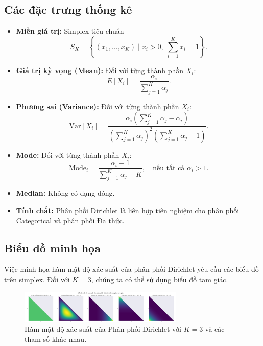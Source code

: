 	\subsection{Các đặc trưng thống kê}
	\begin{itemize}
		\item \textbf{Miền giá trị:} Simplex tiêu chuẩn 
		\[
		S_K = \left\{ (x_1, \dots, x_K) \mid x_i > 0,\; \sum_{i=1}^K x_i = 1 \right\}.
		\]

		\item \textbf{Giá trị kỳ vọng (Mean):} Đối với từng thành phần $X_i$:
		\[
		E[X_i] = \frac{\alpha_i}{\sum_{j=1}^K \alpha_j}.
		\]

		\item \textbf{Phương sai (Variance):} Đối với từng thành phần $X_i$:
		\[
		\mathrm{Var}[X_i] = 
		\frac{\alpha_i \left( \sum_{j=1}^K \alpha_j - \alpha_i \right)}
			{\left( \sum_{j=1}^K \alpha_j \right)^2 \left( \sum_{j=1}^K \alpha_j + 1 \right)}.
		\]

		\item \textbf{Mode:} Đối với từng thành phần $X_i$:
		\[
		\mathrm{Mode}_i = \frac{\alpha_i - 1}{\sum_{j=1}^K \alpha_j - K},
		\quad \text{nếu tất cả } \alpha_i > 1.
		\]

		\item \textbf{Median:} Không có dạng đóng.

		\item \textbf{Tính chất:} Phân phối Dirichlet là liên hợp tiên nghiệm cho phân phối Categorical và phân phối Đa thức.
	\end{itemize}

	
	\subsection{Biểu đồ minh họa}
	Việc minh họa hàm	 mật độ xác suất của phân phối Dirichlet yêu cầu các biểu đồ trên simplex. Đối với $K=3$, chúng ta có thể sử dụng biểu đồ tam giác.
	
	\begin{figure}[h!]
		\centering
		\includegraphics[width=0.7\textwidth]{images/Dirichlet Distribution-PDF.png} %
		\caption{Hàm mật độ xác suất của Phân phối Dirichlet với $K=3$ và các tham số khác nhau.}
		\label{fig:pngDirichlet Distribution-PDF}
	\end{figure}
	
